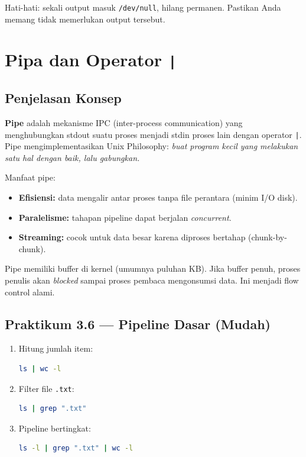 \begin{warningbox}
Hati-hati: sekali output masuk \texttt{/dev/null}, hilang permanen.
Pastikan Anda memang tidak memerlukan output tersebut.
\end{warningbox}

\section{Pipa dan Operator \texttt{|}}
\label{sec:pipes}

\subsection*{Penjelasan Konsep}
\textbf{Pipe} adalah mekanisme IPC (inter-process communication) yang menghubungkan stdout suatu proses menjadi stdin proses lain
dengan operator \texttt{|}. Pipe mengimplementasikan Unix Philosophy:
\textit{buat program kecil yang melakukan satu hal dengan baik, lalu gabungkan.}

Manfaat pipe:
\begin{itemize}
    \item \textbf{Efisiensi:} data mengalir antar proses tanpa file perantara (minim I/O disk).
    \item \textbf{Paralelisme:} tahapan pipeline dapat berjalan \textit{concurrent}.
    \item \textbf{Streaming:} cocok untuk data besar karena diproses bertahap (chunk-by-chunk).
\end{itemize}

\begin{notebox}
Pipe memiliki buffer di kernel (umumnya puluhan KB).
Jika buffer penuh, proses penulis akan \textit{blocked} sampai proses pembaca mengonsumsi data.
Ini menjadi flow control alami.
\end{notebox}

\subsection*{Praktikum 3.6 --- Pipeline Dasar (Mudah)}
\begin{enumerate}
    \item Hitung jumlah item:
\begin{lstlisting}[language=bash, caption={Hitung item di direktori}]
ls | wc -l
\end{lstlisting}

    \item Filter file \texttt{.txt}:
\begin{lstlisting}[language=bash, caption={Filter txt}]
ls | grep ".txt"
\end{lstlisting}

    \item Pipeline bertingkat:
\begin{lstlisting}[language=bash, caption={Filter lalu hitung}]
ls -l | grep ".txt" | wc -l
\end{lstlisting}
\end{enumerate}

